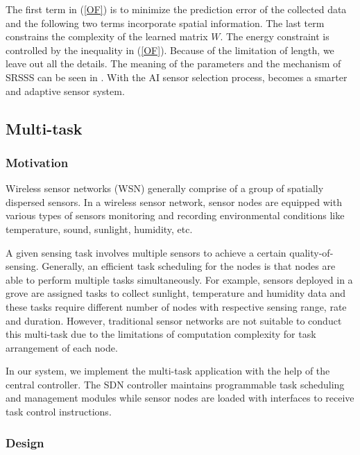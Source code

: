 The first term in (\ref{OF}) is to minimize the prediction error of the collected data
and the following two terms incorporate spatial information. The last term constrains
the complexity of the learned matrix $W$. The energy constraint is controlled by 
the inequality in (\ref{OF}). Because of the limitation of length,  we leave out all the details. 
The meaning of the parameters and the mechanism of 
SRSSS can be seen in \cite{li2016spatially}. With the AI sensor selection process, 
{\sdn} becomes a smarter and adaptive sensor system. 






\subsection{Multi-task}
\label{subsectionmultitask}
\subsubsection{Motivation}

Wireless sensor networks (WSN)  generally comprise of a group of 
spatially dispersed sensors. In a wireless sensor network, 
sensor nodes are equipped with various 
types of sensors monitoring and recording 
environmental conditions like temperature, sound, sunlight,
humidity, etc.

A given sensing task involves multiple sensors to 
achieve a certain quality-of-sensing.
Generally, an efficient task scheduling for the nodes is that nodes 
are able to perform multiple tasks simultaneously. 
For example, sensors deployed in a grove are assigned tasks to collect
sunlight, temperature and humidity data and these tasks require different 
number of  nodes with respective sensing range, rate and duration.
However, traditional sensor networks are not suitable to conduct this 
multi-task due to the limitations of computation complexity for task 
arrangement of each node.

In our {\sdn} system, we implement the multi-task application 
with the help of the central controller. The SDN controller
maintains programmable task scheduling and management
modules while sensor nodes are loaded with interfaces to
receive task control instructions.     

\subsubsection{Design}


